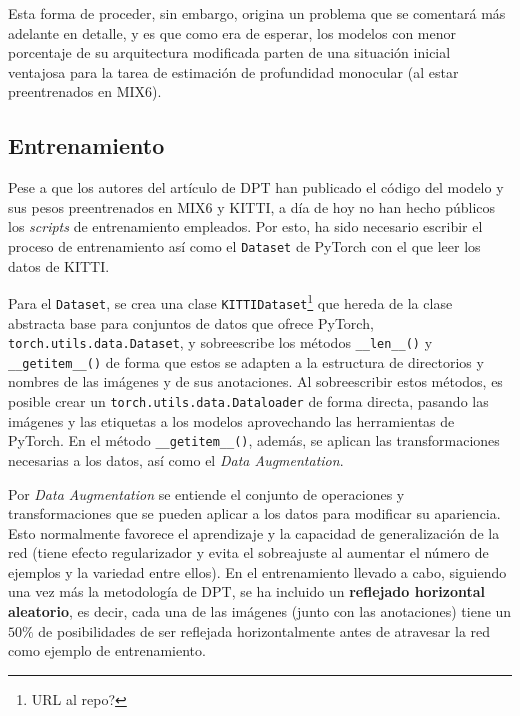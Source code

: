 Esta forma de proceder, sin embargo, origina un problema que se comentará más adelante en detalle, y es que como era de esperar, los modelos con menor porcentaje de su arquitectura modificada parten de una situación inicial ventajosa para la tarea de estimación de profundidad monocular (al estar preentrenados en MIX6).

\subsection{Entrenamiento}
Pese a que los autores del artículo de DPT \cite{visiontransformersDPT} han publicado el código del modelo y sus pesos preentrenados en MIX6 y KITTI, a día de hoy no han hecho públicos los \textit{scripts} de entrenamiento empleados. Por esto, ha sido necesario escribir el proceso de entrenamiento así como el \texttt{Dataset} de PyTorch con el que leer los datos de KITTI.

Para el \texttt{Dataset}, se crea una clase \texttt{KITTIDataset}\footnote{URL al repo?} que hereda de la clase abstracta base para conjuntos de datos que ofrece PyTorch, \texttt{torch.utils.data.Dataset}, y sobreescribe los métodos \texttt{\_\_len\_\_()} y \texttt{\_\_getitem\_\_()} de forma que estos se adapten a la estructura de directorios y nombres de las imágenes y de sus anotaciones. Al sobreescribir estos métodos, es posible crear un \texttt{torch.utils.data.Dataloader} de forma directa, pasando las imágenes y las etiquetas a los modelos aprovechando las herramientas de PyTorch. En el método \texttt{\_\_getitem\_\_()}, además, se aplican las transformaciones necesarias a los datos, así como el \textit{Data Augmentation}.

Por \textit{Data Augmentation} se entiende el conjunto de operaciones y transformaciones que se pueden aplicar a los datos para modificar su apariencia. Esto normalmente favorece el aprendizaje y la capacidad de generalización de la red (tiene efecto regularizador y evita el sobreajuste al aumentar el número de ejemplos y la variedad entre ellos). En el entrenamiento llevado a cabo, siguiendo una vez más la metodología de DPT, se ha incluido un \textbf{reflejado horizontal aleatorio}, es decir, cada una de las imágenes (junto con las anotaciones) tiene un $50\%$ de posibilidades de ser reflejada horizontalmente antes de atravesar la red como ejemplo de entrenamiento.

